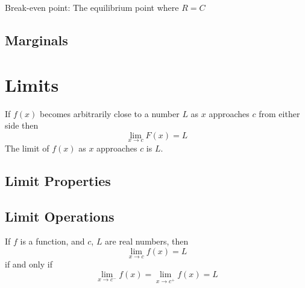 \documentclass{article}
\begin{document}
Break-even point: The equilibrium point where $R = C$

\subsection{Marginals}




\section{Limits}

\begin{definition}\label{def:limit}
    If $f(x)$ becomes arbitrarily close to a number $L$ as $x$ approaches $c$ from either side then
    \begin{equation*}
        \lim_{x \to c} F(x) = L
    \end{equation*}
    The limit of $f(x)$ as $x$ approaches $c$ is $L$.
\end{definition}

\subsection{Limit Properties}

\subsection{Limit Operations}

\begin{definition}\label{def:limit-exists}
    If $f$ is a function, and $c$, $L$ are real numbers, then
    \begin{equation*}
        \lim_{x \to c} f(x) = L
    \end{equation*}
    if and only if
    \begin{equation*}
        \lim_{x \to c^-} f(x) = \lim_{x \to c^+} f(x) = L
    \end{equation*}
\end{definition}
\end{document}
